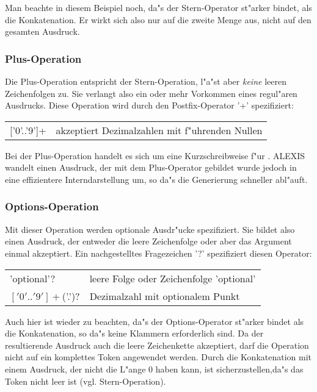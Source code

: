 Man beachte in diesem Beispiel noch, da"s der Stern-Operator st"arker bindet, als
die Konkatenation. Er wirkt sich also nur auf die zweite Menge aus, nicht auf den
gesamten Ausdruck. 
\subsubsection{Plus-Operation}
Die Plus-Operation entspricht der Stern-Operation, l"a"st aber {\it keine\/} leeren
Zeichenfolgen zu. Sie verlangt also ein oder mehr Vorkommen eines regul"aren
Ausdrucks. Diese Operation wird durch den Postfix-Operator '+' spezifiziert:

\medskip

\begin{tabular}{ll}
['0'..'9']+&akzeptiert Dezimalzahlen mit f"uhrenden Nullen\\
\end{tabular}

\medskip

Bei der Plus-Operation handelt es sich um eine Kurzschreibweise f"ur . ALEXIS wandelt einen Ausdruck, der mit dem Plus-Operator gebildet
wurde jedoch in eine effizientere Interndarstellung um, so da"s die Generierung
schneller abl"auft.
\subsubsection{Options-Operation}
Mit dieser Operation werden optionale Ausdr"ucke spezifiziert. Sie bildet also
einen Ausdruck, der entweder die leere Zeichenfolge oder aber das Argument einmal
akzeptiert. Ein nachgestelltes Fragezeichen '?' spezifiziert diesen Operator:

\medskip

\begin{tabular}{ll}
'optional'?&leere Folge oder Zeichenfolge 'optional'\\
$['0'..'9']+$('.')?&Dezimalzahl mit optionalem Punkt\\
\end{tabular}

\medskip

Auch hier ist wieder zu beachten, da"s der Options-Operator st"arker bindet als die
Konkatenation, so da"s keine Klammern erforderlich sind. Da der resultierende
Ausdruck auch die leere Zeichenkette akzeptiert, darf die Operation nicht auf ein
komplettes Token angewendet werden. Durch die Konkatenation mit einem Ausdruck, der
nicht die L"ange 0 haben kann, ist sicherzustellen,da"s das Token nicht leer ist (vgl.
Stern-Operation).

